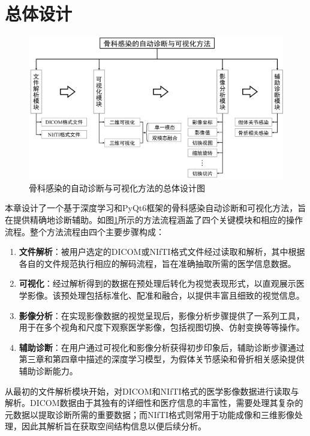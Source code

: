 \section{总体设计}

\begin{figure}[h]
    \centering
    \includegraphics[width=\textwidth]{figures/chap05_overall.png}
    \caption{骨科感染的自动诊断与可视化方法的总体设计图}
    \label{fig:chap05_overall}
\end{figure}

本章设计了一个基于深度学习和PyQt6框架的骨科感染自动诊断和可视化方法，旨在提供精确地诊断辅助。如图\ref{fig:chap05_overall}所示的方法流程涵盖了四个关键模块和相应的操作流程。整个方法流程由四个主要步骤构成：
\begin{enumerate}
    \item \textbf{文件解析}：被用户选定的DICOM或NIfTI格式文件经过读取和解析，其中根据各自的文件规范执行相应的解码流程，旨在准确抽取所需的医学信息数据。
    \item \textbf{可视化}：经过解析得到的数据在预处理后转化为视觉表现形式，以直观展示医学影像。该预处理包括标准化、配准和融合，以提供丰富且细致的视觉信息。
    \item \textbf{影像分析}：在实现影像数据的视觉呈现后，影像分析步骤提供了一系列工具，用于在多个视角和尺度下观察医学影像，包括视图切换、仿射变换等等操作。
    \item \textbf{辅助诊断}：在用户通过可视化和影像分析获得初步印象后，辅助诊断步骤通过第三章和第四章中描述的深度学习模型，为假体关节感染和骨折相关感染提供辅助诊断能力。
\end{enumerate}

从最初的文件解析模块开始，对DICOM和NIfTI格式的医学影像数据进行读取与解析。DICOM数据由于其独有的详细性和医疗信息的丰富性，需要处理其复杂的元数据以提取诊断所需的重要数据；而NIfTI格式则常用于功能成像和三维影像处理，因此其解析旨在获取空间结构信息以便后续分析。

